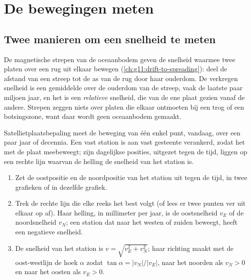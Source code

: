 \section{De bewegingen meten}

\subsection{Twee manieren om een snelheid te meten}

De magnetische strepen van de oceaanbodem geven de snelheid waarmee twee platen
over een rug uit elkaar bewegen (\cref{ch:g11:drift-to-spreading}): deel de
afstand van een streep tot de as van de rug door haar ouderdom. De verkregen
snelheid is een gemiddelde over de ouderdom van de streep, vaak de laatste paar
miljoen jaar, en het is een \emph{relatieve} snelheid, die van de ene plaat gezien
vanaf de andere. Strepen zeggen niets over platen die elkaar ontmoeten bij een
trog of een botsingszone, want daar wordt geen oceaanbodem gemaakt.

Satellietplaatsbepaling meet de beweging van één enkel punt, vandaag, over een
paar jaar of decennia. Een vast station is aan vast gesteente verankerd, zodat
het met de plaat meebeweegt; zijn dagelijkse posities, uitgezet tegen de tijd,
liggen op een rechte lijn waarvan de helling de snelheid van het station is.

\begin{method}\label{met:g11:plate-motions:rate}
\begin{enumerate}
  \item Zet de oostpositie en de noordpositie van het station uit tegen de
        tijd, in twee grafieken of in dezelfde grafiek.
  \item Trek de rechte lijn die elke reeks het best volgt (of lees er twee
        punten ver uit elkaar op af). Haar helling, in millimeter per jaar, is de
        oostsnelheid $v_E$ of de noordsnelheid $v_N$; een station dat naar het
        westen of zuiden beweegt, heeft een negatieve snelheid.
  \item De snelheid van het station is $v = \sqrt{v_E^2 + v_N^2}$; haar richting
        maakt met de oost-westlijn de hoek $\alpha$ zodat
        $\tan\alpha = |v_N|/|v_E|$, naar het noorden als $v_N > 0$ en naar
        het oosten als $v_E > 0$.
\end{enumerate}
\end{method}

